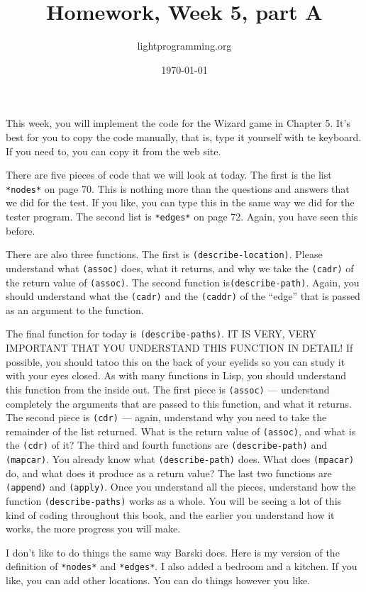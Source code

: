 \documentclass{article}
\title{Homework, Week 5, part A}
\author{lightprogramming.org}
\date{\today}
\begin{document}
\maketitle{}

This week, you will implement the code for the Wizard game in Chapter 5. It's best for you to copy the code manually, that is, type it yourself with te keyboard. If you need to, you can copy it from the web site.

There are five pieces of code that we will look at today. The first is the list \texttt{*nodes*} on page 70. This is nothing more than the questions and answers that we did for the test. If you like, you can type this in the same way we did for the tester program. The second list is \texttt{*edges*} on page 72. Again, you have seen this before.

 There are also three functions. The first is \texttt{(describe-location)}. Please understand what \texttt{(assoc)} does, what it returns, and why we take the \texttt{(cadr)} of the return value of \texttt{(assoc)}. The second function is\texttt{(describe-path)}. Again, you should understand what the \texttt{(cadr)} and the \texttt{(caddr)} of the ``edge'' that is passed as an argument to the function.

The final function for today is \texttt{(describe-paths)}. IT IS VERY, VERY IMPORTANT THAT YOU UNDERSTAND THIS FUNCTION IN DETAIL! If possible, you should tatoo this on the back of your eyelids so you can study it with your eyes closed. As with many functions in Lisp, you should understand this function from the inside out. The first piece is \texttt{(assoc)} --- understand completely the arguments that are passed to this function, and what it returns. The second piece is \texttt{(cdr)} --- again, understand why you need to take the remainder of the list returned. What is the return value of \texttt{(assoc)}, and what is the \texttt{(cdr)} of it? The third and fourth functions are \texttt{(describe-path)} and \texttt{(mapcar)}. You already know what \texttt{(describe-path)} does. What does \texttt{(mpacar)} do, and what does it produce as a return value? The last two functions are \texttt{(append)} and \texttt{(apply)}. Once you understand all the pieces, understand how the function \texttt{(describe-paths)} works as a whole. You will be seeing a lot of this kind of coding throughout this book, and the earlier you understand how it works, the more progress you will make.

I don't like to do things the same way Barski does. Here is my version of the definition of \texttt{*nodes*} and \texttt{*edges*}. I also added a bedroom and a kitchen. If you like, you can add other locations. You can do things however you like.
\end{document}
